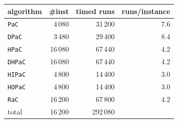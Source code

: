 \begin{tabular}{@{}lrrr@{}}
\toprule
algorithm & \#inst & timed runs & runs/instance \\
\midrule
\texttt{PaC} & 4\,080 & 31\,200 & 7.6 \\
\texttt{DPaC} & 3\,480 & 29\,400 & 8.4 \\
\texttt{HPaC} & 16\,080 & 67\,440 & 4.2 \\
\texttt{DHPaC} & 16\,080 & 67\,440 & 4.2 \\
\texttt{HIPaC} & 4\,800 & 14\,400 & 3.0 \\
\texttt{HOPaC} & 4\,800 & 14\,400 & 3.0 \\
\texttt{RaC} & 16\,200 & 67\,800 & 4.2 \\
\midrule
total & 16\,200 & 292\,080 & \\
\bottomrule
\end{tabular}
